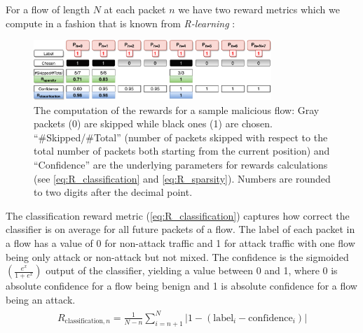 \documentclass[conference]{IEEEtran}
\begin{document}

For a flow of length $N$ at each packet $n$ we have two reward metrics which we compute in a fashion that is known from \textit{R-learning} \cite{schwartz_reinforcement_1993}:


\begin{figure}
\centering
  \includegraphics[width=0.8\textwidth]{img/rewards_calc_example.pdf}
  \caption{The computation of the rewards for a sample malicious flow: Gray packets (0) are skipped while black ones (1) are chosen. ``\#Skipped\//\#Total'' (number of packets skipped with respect to the total number of packets both starting from the current position) and ``Confidence'' are the underlying parameters for rewards calculations (see \autoref{eq:R_classification} and \autoref{eq:R_sparsity}). Numbers are rounded to two digits after the decimal point.}
  \label{fig:rewards}
\end{figure}

The classification reward metric (\autoref{eq:R_classification}) captures how correct the classifier is on average for all future packets of a flow. The label of each packet in a flow has a value of 0 for non-attack traffic and 1 for attack traffic with one flow being only attack or non-attack but not mixed. The confidence is the sigmoided $\left(\frac{e^x}{1+e^x}\right)$ output of the classifier, yielding a value between 0 and 1, where 0 is absolute confidence for a flow being benign and 1 is absolute confidence for a flow being an attack.
\begin{align}
\begin{split}
R_{\text{classification},n} = \frac{1}{N-n} \sum_{i=n+1}^{N} |1 - \left(\text{label}_i - \text{confidence}_i\right)|
\end{split}
\label{eq:R_classification}
\end{align}
\end{document}
